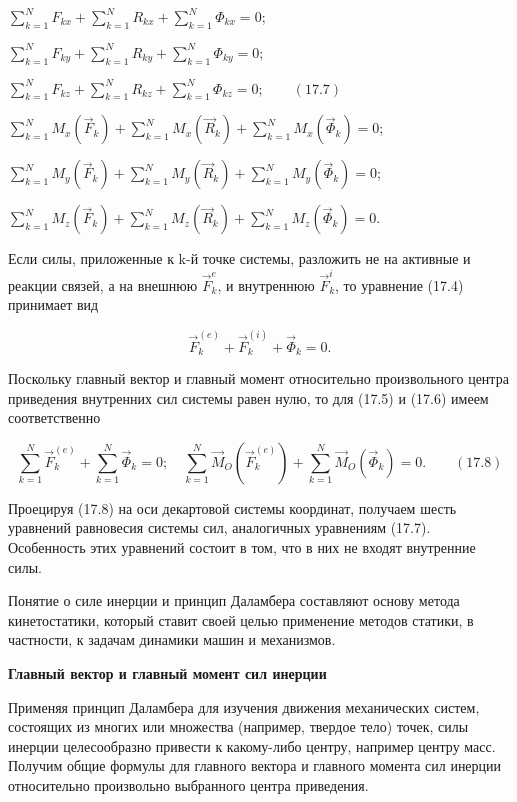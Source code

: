 {\begin{center}
        \par$ \sum\limits_{k=1}^N F_{kx} + \sum\limits_{k=1}^N R_{kx} + \sum\limits_{k=1}^N \Phi_{kx} = 0$;
	  \par$ \sum\limits_{k=1}^N F_{ky} + \sum\limits_{k=1}^N R_{ky} + \sum\limits_{k=1}^N \Phi_{ky} = 0$;
	  \par$ \sum\limits_{k=1}^N F_{kz} + \sum\limits_{k=1}^N R_{kz} + \sum\limits_{k=1}^N \Phi_{kz} = 0; \qquad (17.7)$
	  \par$ \sum\limits_{k=1}^N M_x (\vec F_k) + \sum\limits_{k=1}^N M_x (\vec R_k) + \sum\limits_{k=1}^N M_x (\vec\Phi_k) = 0$;
	  \par$ \sum\limits_{k=1}^N M_y (\vec F_k) + \sum\limits_{k=1}^N M_y (\vec R_k) + \sum\limits_{k=1}^N M_y (\vec\Phi_k) = 0$;
	  \par$ \sum\limits_{k=1}^N M_z (\vec F_k) + \sum\limits_{k=1}^N M_z (\vec R_k) + \sum\limits_{k=1}^N M_z (\vec\Phi_k) = 0$.

	  \par Если силы, приложенные к k-й точке системы, разложить не на активные и реакции связей, а на внешнюю $\vec F_k^e$, и внутреннюю $\vec F_k^i$, то уравнение (17.4) принимает вид

        $$ \vec F_k^{(e)} + \vec F_k^{(i)} + \vec\Phi_k = 0.$$
        \par Поскольку главный вектор и главный момент относительно произвольного центра приведения внутренних сил системы равен нулю, то для (17.5) и (17.6) имеем соответственно

	  $$ \sum\limits_{k=1}^N \vec F_k^{(e)} + \sum\limits_{k=1}^N \vec\Phi_k = 0; \quad \sum\limits_{k=1}^N \vec M_O (\vec F_k^{(e)}) + \sum\limits_{k=1}^N \vec M_O (\vec\Phi_k) = 0. \qquad (17.8)$$

	  \par Проецируя  (17.8)  на  оси  декартовой  системы  координат,  получаем  шесть уравнений  равновесия  системы  сил,  аналогичных  уравнениям  (17.7).  Особенность этих уравнений состоит в том, что в них не входят внутренние силы.
	  \par Понятие о силе инерции и принцип Даламбера составляют основу метода кинетостатики, который ставит своей целью применение методов статики, в частности, к задачам динамики машин и механизмов.
        \par\textbf{Главный вектор и главный момент сил инерции}

	  \par Применяя принцип Даламбера для изучения движения механических систем, состоящих из многих или множества (например, твердое тело) точек, силы инерции целесообразно привести к какому-либо центру, например центру масс. Получим общие формулы для главного вектора и главного момента сил инерции относительно произвольно выбранного центра приведения.


\end{center}}
